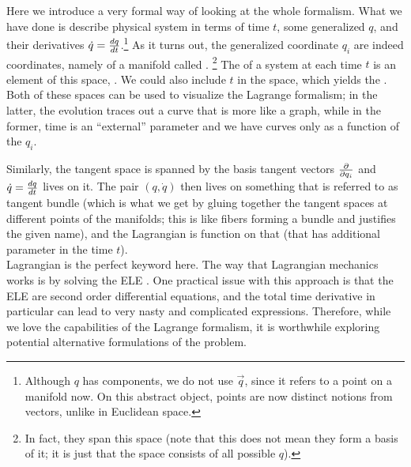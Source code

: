 \documentclass[../class_mech_main.tex]{subfiles}
\begin{document}
Here we introduce a very formal way of looking at the whole formalism. What we have done is describe physical system in terms of time $t$, some generalized  $q$, and their derivatives $\dot{q} = \dv{q}{t}$.\footnote{Although $q$ has components, we do not use $\vec{q}$, since it refers to a point on a manifold now. On this abstract object, points are now distinct notions from vectors, unlike in Euclidean space.}
As it turns out, the generalized coordinate $q_i$ are indeed coordinates, namely of a manifold called .%
\footnote{In fact, they span this space (note that this does not mean they form a basis of it; it is just that the space consists of all possible $q$). }
The  of a system at each time $t$ is an element of this space, . We could also include $t$ in the space, which yields the . Both of these spaces can be used to visualize the Lagrange formalism; in the latter, the evolution traces out a curve that is more like a graph, while in the former, time is an \enquote{external} parameter and we have curves only as a function of the $q_i$.


Similarly, the tangent space is spanned by the basis tangent vectors $\pdv{q_i}$ and $\dot{q} = \dv{q}{t}$ lives on it. The pair $(q, \dot{q})$ then lives on something that is referred to as tangent bundle (which is what we get by gluing together the tangent spaces at different points of the manifolds; this is like fibers forming a bundle and justifies the given name), and the Lagrangian is function on that (that has additional parameter in the time $t$).\\


Lagrangian is the perfect keyword here. The way that Lagrangian mechanics works is by solving the ELE . One practical issue with this approach is that the ELE are second order differential equations, and the total time derivative in particular can lead to very nasty and complicated expressions. Therefore, while we love the capabilities of the Lagrange formalism, it is worthwhile exploring potential alternative formulations of the problem.
\end{document}
